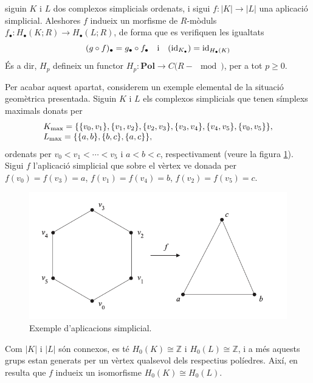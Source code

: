 \documentclass[../main.tex]{subfiles}
\begin{document}
\begin{prop}
siguin $K$ i $L$ dos complexos simplicials ordenats, i sigui $f:|K|\rightarrow |L|$ una aplicació simplicial. Aleshores $f$ indueix un morfisme de $R$-mòduls $f_\bullet:H_\bullet(K;R)\rightarrow H_\bullet(L;R)$, de forma que es verifiquen les igualtats
\begin{equation}
    \notag
    (g\circ f)_\bullet = g_\bullet\circ f_\bullet\quad\text{i}\quad (\mathrm{id}_{K_\bullet})=\mathrm{id}_{H_\bullet(K)}
\end{equation}
És a dir, $H_p$ defineix un functor $H_p:\mathbf{Pol}\rightarrow C(R-\mod)$, per a tot $p\geq 0$.
\end{prop}

Per acabar aquest apartat, considerem un exemple elemental de la situació geomètrica presentada. Siguin $K$ i $L$ els complexos simplicials que tenen símplexs maximals donats per
\begin{equation}
    \notag
    \begin{array}{ll}
        K_{\max} = \{\{v_0,v_1\},\{v_1,v_2\},\{v_2,v_3\},\{v_3,v_4\},\{v_4,v_5\},\{v_0,v_5\}\},\\
        L_{\max} = \{\{a,b\},\{b,c\},\{a,c\}\},
    \end{array}
\end{equation}
ordenats per $v_0<v_1<\cdots <v_5$ i $a<b<c$, respectivament (veure la figura \ref{fig:exemplefinalhomologiasimplicial}). Sigui $f$ l'aplicació simplicial que sobre el vèrtex ve donada per $f(v_0) = f(v_3) = a$, $f(v_1) = f(v_4) = b$, $f(v_2) = f(v_5) = c$.
\begin{figure}
    \centering
    \includegraphics[scale = 0.25]{pictures/exemplefinalhomologiasimplicial.png}
    \caption{Exemple d'aplicacions simplicial.}
    \label{fig:exemplefinalhomologiasimplicial}
\end{figure}

Com $|K|$ i $|L|$ són connexos, es té $H_0(K)\cong \mathbb{Z}$ i $H_0(L)\cong \mathbb{Z}$, i a més aquests grups estan generats per un vèrtex qualsevol dels respectius políedres. Així, en resulta que $f$ indueix un isomorfisme $H_0(K)\cong H_0(L)$.
\end{document}
